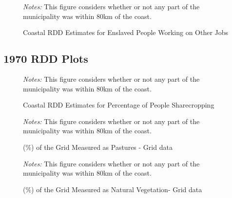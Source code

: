 \documentclass{article}
\begin{document}
\begin{figure}
  \caption{Coastal RDD Estimates for Enslaved People Working on Other Jobs}
  \begin{center}
  \textit{Notes:} This figure considers whether or not any part of the municipality was within 80km of the coast.
  \end{center}
  \label{fig:1872_RDD_Free_Jornaleiros}
\end{figure}

\subsection*{1970 RDD Plots}

\begin{figure}[h!]
  \caption{Coastal RDD Estimates for Percentage of People Sharecropping}
  \begin{center}
  \textit{Notes:} This figure considers whether or not any part of the municipality was within 80km of the coast.
  \end{center}
  \label{fig:1970_RDD_Sharecropping}
\end{figure}

\clearpage

\begin{figure}
  \caption{(\%) of the Grid Measured as Pastures - Grid data}
  \begin{center}
  \textit{Notes:} This figure considers whether or not any part of the municipality was within 80km of the coast.
  \end{center}
  \label{fig:pasture_grid}
\end{figure}

\begin{figure}
  \caption{(\%) of the Grid Measured as Natural Vegetation- Grid data}
  \begin{center}
  \textit{Notes:} This figure considers whether or not any part of the municipality was within 80km of the coast.
  \end{center}
  \label{fig:natural_grid}
\end{figure}
\end{document}
